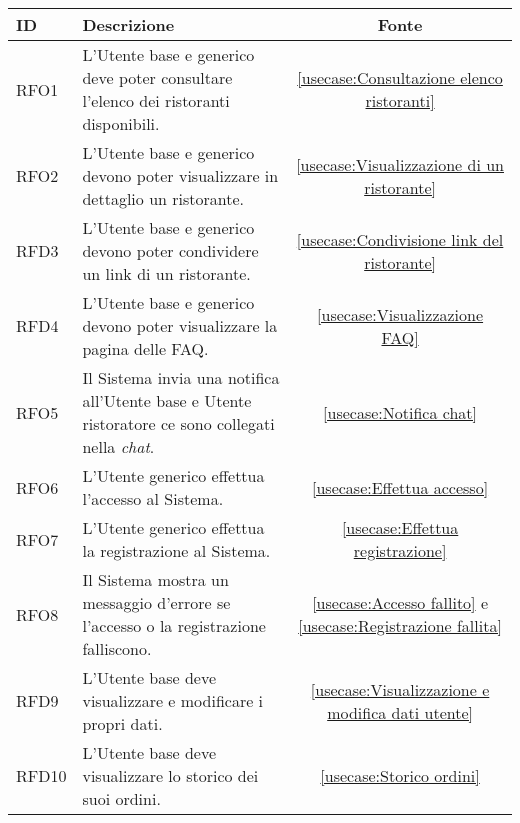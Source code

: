 \begin{table}[H]
	\renewcommand{\arraystretch}{1.5}
	\centering
	\begin{tabularx}{\textwidth}{l|X|c}
		\textbf{ID} & \textbf{Descrizione}                                                                                                      & \textbf{Fonte} \\
		\hline
		RFO1        & L'Utente base e generico deve poter consultare l'elenco dei ristoranti disponibili.                                       & \autoref{usecase:Consultazione elenco ristoranti}            \\
		\hline
		RFO2        & L'Utente base e generico devono poter visualizzare in dettaglio un ristorante.                                             & \autoref{usecase:Visualizzazione di un ristorante}            \\
		\hline
		RFD3        & L'Utente base e generico devono poter condividere un link di un ristorante.                                                & \autoref{usecase:Condivisione link del ristorante}             \\
		\hline
		RFD4        & L'Utente base e generico devono poter visualizzare la pagina delle FAQ.                                                   & \autoref{usecase:Visualizzazione FAQ}            \\
		\hline
		RFO5        & Il Sistema invia una notifica all'Utente base e Utente ristoratore ce sono collegati nella \textit{chat}.                 &  \autoref{usecase:Notifica chat}            \\
		\hline
		RFO6        & L'Utente generico effettua l'accesso al Sistema. 																            &  \autoref{usecase:Effettua accesso}            \\
		\hline
		RFO7       & L'Utente generico effettua la registrazione al Sistema.                                   							    &  \autoref{usecase:Effettua registrazione}            \\
		\hline
		RFO8        & Il Sistema mostra un messaggio d'errore se l'accesso o la registrazione falliscono.                                		&  \autoref{usecase:Accesso fallito} e \autoref{usecase:Registrazione fallita}             \\
		\hline
		RFD9       & L'Utente base deve visualizzare e modificare i propri dati.                                                 				&  \autoref{usecase:Visualizzazione e modifica dati utente}            \\
		\hline
		RFD10       & L'Utente base deve visualizzare lo storico dei suoi ordini.                                                    			&  \autoref{usecase:Storico ordini}           \\

\end{tabularx}
\end{table}
